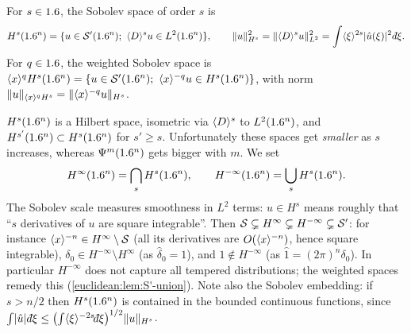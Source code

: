 \begin{definition}\label{euclidean:def:sobolev}
  For $s\in1.6$, the Sobolev space of order $s$ is
  \begin{equation*}
    H^s(\R^n)=\{u\in\cSp(\R^n);\ \ang D^su\in L^2(\R^n)\},\qquad
    \norm u_{H^s}^2=\norm{\ang D^su}_{L^2}^2=\int\ang\xi^{2s}\abs{\hat u(\xi)}^2\,\dbar\xi.
  \end{equation*}
  For $q\in1.6$, the weighted Sobolev space is
  $\langle x\rangle^qH^s(1.6^n)=\{u\in\mathcal{S}'(1.6^n);\ \langle x\rangle^{-q}u\in H^s(1.6^n)\}$, with norm
  $\lVert u\rVert_{\langle x\rangle^qH^s}=\lVert \langle x\rangle^{-q}u\rVert_{H^s}$.
\end{definition}

$H^s(1.6^n)$ is a Hilbert space, isometric via $\langle D\rangle^s$ to $L^2(1.6^n)$, and
$H^{s'}(1.6^n)\subset H^s(1.6^n)$ for $s'\ge s$. Unfortunately these spaces get
\emph{smaller} as $s$ increases, whereas $\Psi^{m}(1.6^n)$ gets bigger with
$m$. We set
\begin{equation*}
  H^\infty(1.6^n)=\bigcap_sH^s(1.6^n),\qquad H^{-\infty}(1.6^n)=\bigcup_sH^s(1.6^n).
\end{equation*}
The Sobolev scale measures smoothness in $L^2$ terms: $u\in H^s$ means roughly that
``$s$ derivatives of $u$ are square integrable''. Then $\mathcal{S}\subsetneq H^\infty\subsetneq H^{-\infty}\subsetneq\mathcal{S}'$: for
instance $\langle x\rangle^{-n}\in H^\infty\setminus\mathcal{S}$ (all its derivatives are
$O(\langle x\rangle^{-n})$, hence square integrable), $\delta_0\in H^{-\infty}\setminus H^\infty$
(as $\hat\delta_0=1$), and $1\notin H^{-\infty}$ (as $\hat 1=(2\pi)^n\delta_0$).
In particular $H^{-\infty}$ does not capture all tempered distributions; the
weighted spaces remedy this (\cref{euclidean:lem:S'-union}). Note also the
Sobolev embedding: if $s>n/2$ then $H^s(1.6^n)$ is contained in the bounded
continuous functions, since
$\int\abs{\hat u}\,\dbar\xi\le\bigl(\int\ang\xi^{-2s}\dbar\xi\bigr)^{1/2}\norm u_{H^s}$.

